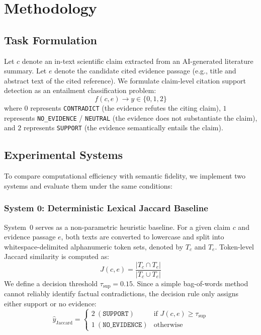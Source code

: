 \documentclass[11pt,a4paper]{article}
\begin{document}
\section{Methodology}
\label{sec:methodology}
\subsection{Task Formulation}
Let $c$ denote an in-text scientific claim extracted from an AI-generated literature summary. Let $e$ denote the candidate cited evidence passage (e.g., title and abstract text of the cited reference). We formulate claim-level citation support detection as an entailment classification problem:
\begin{equation}
    f(c, e) \rightarrow y \in \{0, 1, 2\}
\end{equation}
where $0$ represents \texttt{CONTRADICT} (the evidence refutes the citing claim), $1$ represents \texttt{NO\_EVIDENCE} / \texttt{NEUTRAL} (the evidence does not substantiate the claim), and $2$ represents \texttt{SUPPORT} (the evidence semantically entails the claim).

\subsection{Experimental Systems}
To compare computational efficiency with semantic fidelity, we implement two systems and evaluate them under the same conditions:

\subsubsection{System 0: Deterministic Lexical Jaccard Baseline}
System~0 serves as a non-parametric heuristic baseline. For a given claim $c$ and evidence passage $e$, both texts are converted to lowercase and split into whitespace-delimited alphanumeric token sets, denoted by $T_c$ and $T_e$. Token-level Jaccard similarity is computed as:
\begin{equation}
    J(c, e) = \frac{|T_c \cap T_e|}{|T_c \cup T_e|}
\end{equation}
We define a decision threshold $\tau_{\text{sup}} = 0.15$. Since a simple bag-of-words method cannot reliably identify factual contradictions, the decision rule only assigns either support or no evidence:
\begin{equation}
    \hat{y}_{\text{Jaccard}} = 
    \begin{cases} 
      2 \ (\texttt{SUPPORT}) & \text{if } J(c, e) \ge \tau_{\text{sup}} \\
      1 \ (\texttt{NO\_EVIDENCE}) & \text{otherwise}
    \end{cases}
\end{equation}
\end{document}
